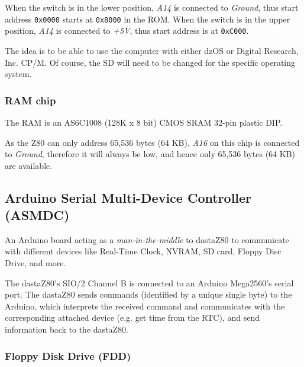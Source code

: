 \documentclass[a4paper,11pt]{article}
\begin{document}
    When the switch is in the lower position, \textit{A14} is connected to 
    \textit{Ground}, thus start address \texttt{0x0000} starts at 
    \texttt{0x8000} in the ROM. When the switch is in the upper position, 
    \textit{A14} is connected to \textit{+5V}, thus start address is at 
    \texttt{0xC000}.

    The idea is to be able to use the computer with either dzOS or Digital 
    Research, Inc. CP/M. Of course, the SD will need to be changed for the
    specific operating system.

    \subsubsection{RAM chip}

    The RAM is an AS6C1008 (128K x 8 bit) CMOS SRAM 32-pin plastic DIP.

    As the Z80 can only address 65,536 bytes (64 KB), \textit{A16} on this chip
    is connected to \textit{Ground}, therefore it will always be low, and hence
    only 65,536 bytes (64 KB) are available.

    \subsection{ Arduino Serial Multi-Device Controller (ASMDC)}

    An Arduino board acting as a \textit{man-in-the-middle} to dastaZ80 to
    communicate with different devices like Real-Time Clock, NVRAM, SD card,
    Floppy Disc Drive, and more.

    The dastaZ80's SIO/2 Channel B is connected to an Arduino Mega2560's serial
    port. The dastaZ80 sends commands (identified by a unique single byte) to
    the Arduino, which interprets the received command and communicates with the
    corresponding attached device (e.g. get time from the RTC), and send
    information back to the dastaZ80.

    \subsubsection{Floppy Disk Drive (FDD)}
\end{document}

